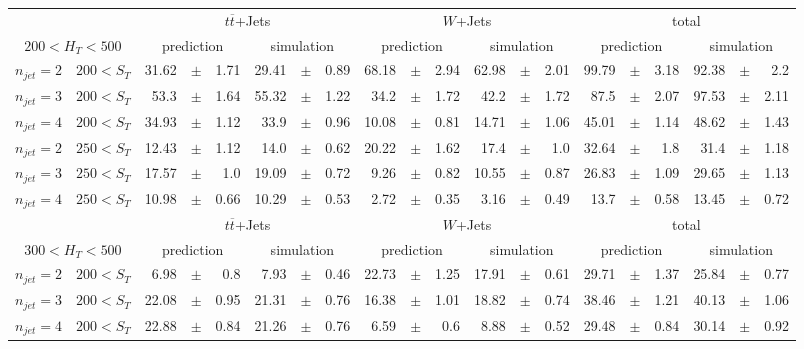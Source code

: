 \documentclass[12pt]{paper}
\begin{document}
\begin{sidewaystable}[ht]
\begin{center}
\begin{tabular}{cc|rrr|rrr|rrr|rrr|rrr|rrr}
& & \multicolumn{6}{c|}{$t\overline{t}$+Jets}&\multicolumn{6}{c|}{$W$+Jets}&\multicolumn{6}{c}{total}\\
\multicolumn{2}{c|}{$200< H_{T}< 500$} & \multicolumn{3}{c}{prediction}&\multicolumn{3}{c|}{simulation}&\multicolumn{3}{c}{prediction}&\multicolumn{3}{c|}{simulation}&\multicolumn{3}{c}{prediction}&\multicolumn{3}{c}{simulation}\\\hline
$n_{jet}=2$ & $200< S_{T}$ & 31.62&$\pm$&1.71 & 29.41&$\pm$&0.89 & 68.18&$\pm$&2.94 & 62.98&$\pm$&2.01 & 99.79&$\pm$&3.18 & 92.38&$\pm$&2.2\\
$n_{jet}=3$ & $200< S_{T}$ & 53.3&$\pm$&1.64 & 55.32&$\pm$&1.22 & 34.2&$\pm$&1.72 & 42.2&$\pm$&1.72 & 87.5&$\pm$&2.07 & 97.53&$\pm$&2.11\\
$n_{jet}=4$ & $200< S_{T}$ & 34.93&$\pm$&1.12 & 33.9&$\pm$&0.96 & 10.08&$\pm$&0.81 & 14.71&$\pm$&1.06 & 45.01&$\pm$&1.14 & 48.62&$\pm$&1.43\\
$n_{jet}=2$ & $250< S_{T}$ & 12.43&$\pm$&1.12 & 14.0&$\pm$&0.62 & 20.22&$\pm$&1.62 & 17.4&$\pm$&1.0 & 32.64&$\pm$&1.8 & 31.4&$\pm$&1.18\\
$n_{jet}=3$ & $250< S_{T}$ & 17.57&$\pm$&1.0 & 19.09&$\pm$&0.72 & 9.26&$\pm$&0.82 & 10.55&$\pm$&0.87 & 26.83&$\pm$&1.09 & 29.65&$\pm$&1.13\\
$n_{jet}=4$ & $250< S_{T}$ & 10.98&$\pm$&0.66 & 10.29&$\pm$&0.53 & 2.72&$\pm$&0.35 & 3.16&$\pm$&0.49 & 13.7&$\pm$&0.58 & 13.45&$\pm$&0.72\\
\hline
& & \multicolumn{6}{c|}{$t\overline{t}$+Jets}&\multicolumn{6}{c|}{$W$+Jets}&\multicolumn{6}{c}{total}\\
\multicolumn{2}{c|}{$300< H_{T}< 500$} & \multicolumn{3}{c}{prediction}&\multicolumn{3}{c|}{simulation}&\multicolumn{3}{c}{prediction}&\multicolumn{3}{c|}{simulation}&\multicolumn{3}{c}{prediction}&\multicolumn{3}{c}{simulation}\\\hline
$n_{jet}=2$ & $200< S_{T}$ & 6.98&$\pm$&0.8 & 7.93&$\pm$&0.46 & 22.73&$\pm$&1.25 & 17.91&$\pm$&0.61 & 29.71&$\pm$&1.37 & 25.84&$\pm$&0.77\\
$n_{jet}=3$ & $200< S_{T}$ & 22.08&$\pm$&0.95 & 21.31&$\pm$&0.76 & 16.38&$\pm$&1.01 & 18.82&$\pm$&0.74 & 38.46&$\pm$&1.21 & 40.13&$\pm$&1.06\\
$n_{jet}=4$ & $200< S_{T}$ & 22.88&$\pm$&0.84 & 21.26&$\pm$&0.76 & 6.59&$\pm$&0.6 & 8.88&$\pm$&0.52 & 29.48&$\pm$&0.84 & 30.14&$\pm$&0.92\\

\end{tabular}
\end{center}
\end{sidewaystable}
\end{document}
